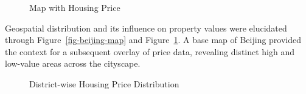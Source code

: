 \documentclass[
  letterpaper,
  DIV=11,
  numbers=noendperiod]{scrartcl}
\begin{document}
\begin{figure}


\caption{\label{fig-beijing-map-with-price}Map with Housing Price}

\end{figure}%

Geospatial distribution and its influence on property values were
elucidated through Figure~\ref{fig-beijing-map} and
Figure~\ref{fig-beijing-map-with-price}. A base map of Beijing provided
the context for a subsequent overlay of price data, revealing distinct
high and low-value areas across the cityscape.

\begin{figure}


\caption{\label{fig-district-wise-housing-price}District-wise Housing
Price Distribution}

\end{figure}%
\end{document}
